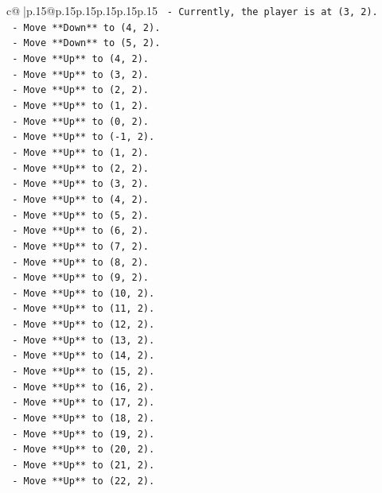 \documentclass{article}
\begin{document}
{\begin{supertabular}{c@{$\;$}|p{.15\linewidth}@{}p{.15\linewidth}p{.15\linewidth}p{.15\linewidth}p{.15\linewidth}p{.15\linewidth}}
{{{\texttt{    {-} Currently, the player is at (3, 2).} \\
\texttt{    {-} Move **Down** to (4, 2).} \\
\texttt{    {-} Move **Down** to (5, 2).} \\
\texttt{    {-} Move **Up** to (4, 2).} \\
\texttt{    {-} Move **Up** to (3, 2).} \\
\texttt{    {-} Move **Up** to (2, 2).} \\
\texttt{    {-} Move **Up** to (1, 2).} \\
\texttt{    {-} Move **Up** to (0, 2).} \\
\texttt{    {-} Move **Up** to ({-}1, 2).} \\
\texttt{    {-} Move **Up** to (1, 2).} \\
\texttt{    {-} Move **Up** to (2, 2).} \\
\texttt{    {-} Move **Up** to (3, 2).} \\
\texttt{    {-} Move **Up** to (4, 2).} \\
\texttt{    {-} Move **Up** to (5, 2).} \\
\texttt{    {-} Move **Up** to (6, 2).} \\
\texttt{    {-} Move **Up** to (7, 2).} \\
\texttt{    {-} Move **Up** to (8, 2).} \\
\texttt{    {-} Move **Up** to (9, 2).} \\
\texttt{    {-} Move **Up** to (10, 2).} \\
\texttt{    {-} Move **Up** to (11, 2).} \\
\texttt{    {-} Move **Up** to (12, 2).} \\
\texttt{    {-} Move **Up** to (13, 2).} \\
\texttt{    {-} Move **Up** to (14, 2).} \\
\texttt{    {-} Move **Up** to (15, 2).} \\
\texttt{    {-} Move **Up** to (16, 2).} \\
\texttt{    {-} Move **Up** to (17, 2).} \\
\texttt{    {-} Move **Up** to (18, 2).} \\
\texttt{    {-} Move **Up** to (19, 2).} \\
\texttt{    {-} Move **Up** to (20, 2).} \\
\texttt{    {-} Move **Up** to (21, 2).} \\
\texttt{    {-} Move **Up** to (22, 2).} \\
}}}
\end{supertabular}}
\end{document}
